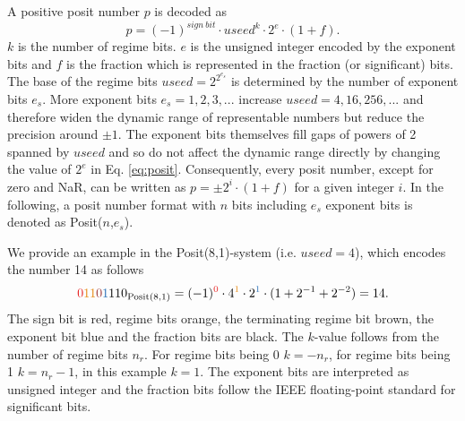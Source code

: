 \documentclass[draft]{agujournal2019}
\newcommand{\op}{\operatorname}
\begin{document}
A positive posit number $p$ is decoded as \cite{Gustafson2017,Gustafson2017a,Chen2018,Klower2019c}
\begin{equation}
p = (-1)^{sign~bit} \cdot useed^k \cdot 2^e \cdot (1+f).
\label{eq:posit}
\end{equation}
$k$ is the number of regime bits. $e$ is the unsigned integer encoded by the
exponent bits and $f$ is the fraction which is represented in the fraction
(or significant) bits. The base of the regime bits $useed = 2^{2^{e_s}}$ is
determined by the number of exponent bits $e_s$. More exponent bits $e_s=1,2,3,...$
increase $useed = 4,16,256,...$ and therefore widen the dynamic range of representable
numbers but reduce the precision around $\pm1$. The exponent bits themselves fill
gaps of powers of 2 spanned by $useed$ and so do not affect
the dynamic range directly by changing the value of $2^e$ in Eq. \ref{eq:posit}.
Consequently, every posit number, except for zero and NaR, can be written as
$p = \pm 2^i \cdot (1+f)$ for a given integer $i$. In the following,
a posit number format with $n$ bits including $e_s$ exponent bits
is denoted as Posit($n$,$e_s$).

We provide an example in the Posit(8,1)-system (i.e. $useed = 4$), which encodes
the number 14 as follows
\begin{equation}
{\color{psign}0}{\color{pregime}11}{\color{pregimet}0}{\color{pexpo}1}110_{\op{Posit}(8,1)}
= (-1)^{\color{psign}0} \cdot 4^{\color{pregime}1} \cdot 2^{\color{pexpo}1}
\cdot (1+2^{-1}+2^{-2}) = 14.
\label{eq:posit_pos}
\end{equation}
The sign bit is red, regime bits orange, the terminating regime bit brown, the
exponent bit blue and the fraction bits are black. The $k$-value
follows from the number of regime bits $n_r$. For regime bits being 0 $k=-n_r$,
for regime bits being 1 $k=n_r-1$, in this example $k=1$.
The exponent bits are interpreted as unsigned integer and the fraction
bits follow the IEEE floating-point standard for significant bits.
\end{document}
